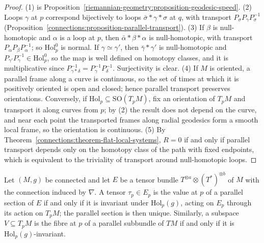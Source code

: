 \begin{proof}
(1) is Proposition~\ref{riemannian-geometry:proposition-geodesic-speed}. (2) Loops $\gamma$ at $p$ correspond bijectively to loops $\bar\sigma * \gamma * \sigma$ at $q$, with transport $P_\sigma P_\gamma P_\sigma^{-1}$
(Proposition~\ref{connections:proposition-parallel-transport}). (3) If $\beta$ is null-homotopic and $\alpha$ is a loop at $p$, then $\bar\alpha * \beta * \alpha$ is null-homotopic, with transport $P_\alpha P_\beta P_\alpha^{-1}$; so
$\mathrm{Hol}^0_p$ is normal. If $\gamma \simeq \gamma'$, then $\bar\gamma * \gamma'$ is null-homotopic and $P_{\gamma'}P_\gamma^{-1} \in \mathrm{Hol}^0_p$, so the map is well defined on homotopy classes, and it is multiplicative since
$P_{\gamma * \delta}^{-1} = P_\gamma^{-1}P_\delta^{-1}$. Surjectivity is clear. (4) If $M$ is oriented, a parallel frame along a curve is continuous, so the set of times at which it is positively oriented is open and closed; hence parallel
transport preserves orientations. Conversely, if $\mathrm{Hol}_p \subseteq \mathrm{SO}(T_pM)$, fix an orientation of $T_pM$ and transport it along curves from $p$; by (2) the result does not depend on the curve, and near each point the
transported frames along radial geodesics form a smooth local frame, so the orientation is continuous. (5) By Theorem~\ref{connections:theorem-flat-local-systems}, $R = 0$ if and only if parallel transport depends only on the
homotopy class of the path with fixed endpoints, which is equivalent to the triviality of transport around null-homotopic loops.
\end{proof}

\begin{theorem}\label{riemannian-geometry:theorem-holonomy-principle}
Let $(M, g)$ be connected and let $E$ be a tensor bundle $T^{\otimes a} \otimes (T^*)^{\otimes b}$ of $M$ with the connection induced by $\nabla$. A tensor $\tau_p \in E_p$ is the value at $p$ of a parallel section of $E$ if and only if it is
invariant under $\mathrm{Hol}_p(g)$, acting on $E_p$ through its action on $T_pM$; the parallel section is then unique. Similarly, a subspace $V \subseteq T_pM$ is the fibre at $p$ of a parallel subbundle of $TM$ if and only if it is
$\mathrm{Hol}_p(g)$-invariant.
\end{theorem}

